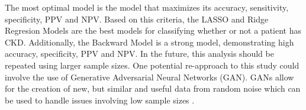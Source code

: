 \documentclass[
]{article}
\begin{document}
The most optimal model is the model that maximizes its accuracy,
sensitivity, specificity, PPV and NPV. Based on this criteria, the LASSO
and Ridge Regresion Models are the best models for classifying whether
or not a patient has CKD. Additionally, the Backward Model is a strong
model, demonstrating high accuracy, specificity, PPV and NPV. In the
future, this analysis should be repeated using larger sample sizes. One
potential re-approach to this study could involve the use of Generative
Adversarial Neural Networks (GAN). GANs allow for the creation of new,
but similar and useful data from random noise which can be used to
handle issues involving low sample sizes \autocite{Saxena2021}.

\newpage

\printbibliography
\end{document}
